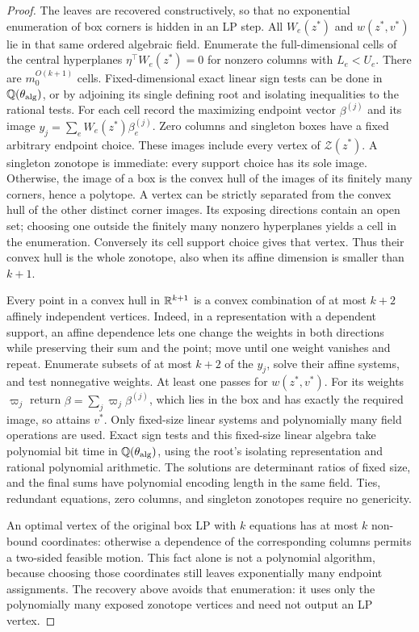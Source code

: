 \begin{proof}
The leaves are recovered constructively, so that no exponential
enumeration of box corners is hidden in an LP step. All $W_e(z^*)$
and $w(z^*,v^*)$ lie in that same ordered algebraic field.
Enumerate the full-dimensional cells of the central hyperplanes
$\eta^\top W_e(z^*)=0$ for nonzero columns with $L_e<U_e$.
There are $m_0^{O(k+1)}$ cells. Fixed-dimensional exact linear sign tests
can be done in $\mathbb{Q}(\theta_{\rm alg})$, or by adjoining its single defining
root and isolating inequalities to the rational tests. For each cell
record the maximizing endpoint vector $\beta^{(j)}$ and its image
$y_j=\sum_e W_e(z^*)\beta_e^{(j)}$. Zero columns and singleton boxes
have a fixed arbitrary endpoint choice.
These images include every vertex of $\mathcal Z(z^*)$. A singleton
zonotope is immediate: every support choice has its sole image. Otherwise,
the image of a box is the convex hull of the images of its finitely
many corners, hence a polytope. A vertex can be strictly separated
from the convex hull of the other distinct corner images. Its exposing
directions contain an open set; choosing one outside the finitely many
nonzero hyperplanes yields a cell in the enumeration. Conversely its
cell support choice gives that vertex. Thus their convex hull is the
whole zonotope, also when its affine dimension is smaller than $k+1$.

Every point in a convex hull in $\mathbb{R}^{k+1}$ is a convex combination of
at most $k+2$ affinely independent vertices. Indeed, in a representation
with a dependent support, an affine dependence lets one change the
weights in both directions while preserving their sum and the point;
move until one weight vanishes and repeat. Enumerate subsets of at
most $k+2$ of the $y_j$, solve their affine systems, and test nonnegative
weights. At least one passes for $w(z^*,v^*)$. For its weights $\varpi_j$
return $\beta=\sum_j\varpi_j\beta^{(j)}$, which lies in the box and has
exactly the required image, so attains $v^*$. Only fixed-size linear
systems and polynomially many field operations are used. Exact sign
tests and this fixed-size linear algebra take polynomial bit time in
$\mathbb{Q}(\theta_{\rm alg})$, using the root's isolating representation and
rational polynomial arithmetic. The solutions are determinant ratios of
fixed size, and the final sums have polynomial encoding length in the
same field. Ties, redundant
equations, zero columns, and singleton zonotopes require no genericity.

An optimal vertex of the original box LP with $k$ equations has at
most $k$ non-bound coordinates: otherwise a dependence of the
corresponding columns permits a two-sided feasible motion. This fact
alone is not a polynomial algorithm, because choosing those coordinates
still leaves exponentially many endpoint assignments. The recovery
above avoids that enumeration: it uses only the polynomially many
exposed zonotope vertices and need not output an LP vertex.
\end{proof}

